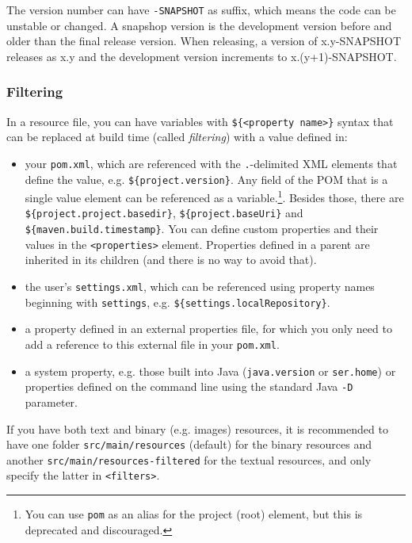 \documentclass[8pt, table, xcdraw]{article}%
\begin{document}
The version number can have \lstinline{-SNAPSHOT} as suffix, which means the code can be unstable or changed. A snapshop version is the development version before and older than the final release version. When releasing, a version of x.y-SNAPSHOT releases as x.y and the development version increments to x.(y+1)-SNAPSHOT.

\subsubsection{Filtering}

In a resource file, you can have variables with \lstinline|${<property name>}| syntax that can be replaced at build time (called \emph{filtering}) with a value defined in:

\begin{itemize}
    \item your \lstinline{pom.xml}, which are referenced with the \lstinline{.}-delimited XML elements that define the value, e.g. \lstinline|${project.version}|. Any field of the POM that is a single value element can be referenced as a variable.\footnote{You can use \lstinline{pom} as an alias for the project (root) element, but this is deprecated and discouraged.}. Besides those, there are \lstinline|${project.project.basedir}|, \lstinline|${project.baseUri}| and \lstinline|${maven.build.timestamp}|. You can define custom properties and their values in the \lstinline{<properties>} element. Properties defined in a parent are inherited in its children (and there is no way to avoid that).
    \item the user's \lstinline{settings.xml}, which can be referenced using property names beginning with \lstinline{settings}, e.g. \lstinline|${settings.localRepository}|.
    \item a property defined in an external properties file, for which you only need to add a reference to this external file in your \lstinline{pom.xml}.
    \item a system property, e.g. those built into Java (\lstinline{java.version} or \lstinline{ser.home}) or properties defined on the command line using the standard Java \lstinline{-D} parameter.
\end{itemize}

If you have both text and binary (e.g. images) resources, it is recommended to have one folder \lstinline{src/main/resources} (default) for the binary resources and another \lstinline{src/main/resources-filtered} for the textual resources, and only specify the latter in \lstinline{<filters>}.
\end{document}
